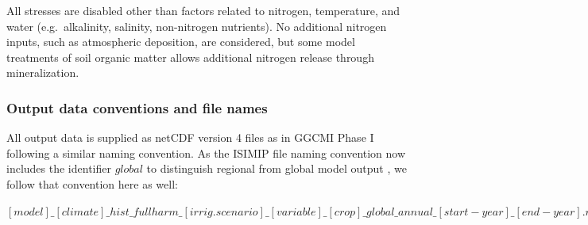 \documentclass[gmd, manuscript]{copernicus} %
\begin{document}
All stresses are disabled other than factors related to nitrogen, temperature, and water (e.g.\ alkalinity, salinity, non-nitrogen nutrients). 
No additional nitrogen inputs, such as atmospheric deposition, are considered, but some model treatments of soil organic matter allows additional nitrogen release through mineralization. 

\subsubsection{Output data conventions and file names}

All output data is supplied as netCDF version 4 files as in GGCMI Phase I \citep{Elliott2015} following a similar naming convention. As the ISIMIP file naming convention now includes the identifier $global$ to distinguish regional from global model output \citep{frieler2017assessing}, we follow that convention here as well:

$[model]\_[climate]\_hist\_fullharm\_[irrig.scenario]\_[variable]\_[crop]\_global\_annual\_[start-year]\_[end-year].nc4$
\end{document}
